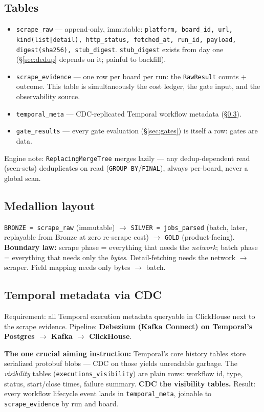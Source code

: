 \documentclass[11pt,a4paper]{article}
\begin{document}
\subsection{Tables}
\begin{itemize}
\item \texttt{scrape\_raw} --- append-only, immutable: \texttt{platform, board\_id, url, kind(list|detail),
http\_status, fetched\_at, run\_id, payload, digest(sha256), stub\_digest}. \texttt{stub\_digest} exists
from day one (\S\ref{sec:dedup} depends on it; painful to backfill).
\item \texttt{scrape\_evidence} --- one row per board per run: the \texttt{RawResult} counts + outcome.
This table is simultaneously the cost ledger, the gate input, and the observability source.
\item \texttt{temporal\_meta} --- CDC-replicated Temporal workflow metadata (\S\ref{sec:cdc}).
\item \texttt{gate\_results} --- every gate evaluation (\S\ref{sec:gates}) is itself a row: gates are data.
\end{itemize}

Engine note: \texttt{ReplacingMergeTree} merges lazily --- any dedup-dependent read (seen-sets) deduplicates
on read (\texttt{GROUP BY}/\texttt{FINAL}), always per-board, never a global scan.

\subsection{Medallion layout}
\texttt{BRONZE = scrape\_raw} (immutable) $\rightarrow$ \texttt{SILVER = jobs\_parsed} (batch, later,
replayable from Bronze at zero re-scrape cost) $\rightarrow$ \texttt{GOLD} (product-facing).
\textbf{Boundary law:} scrape phase = everything that needs the \emph{network}; batch phase = everything
that needs only the \emph{bytes}. Detail-fetching needs the network $\rightarrow$ scraper. Field mapping
needs only bytes $\rightarrow$ batch.

\subsection{Temporal metadata via CDC}
\label{sec:cdc}
Requirement: all Temporal execution metadata queryable in ClickHouse next to the scrape evidence.
Pipeline: \textbf{Debezium (Kafka Connect) on Temporal's Postgres $\rightarrow$ Kafka $\rightarrow$
ClickHouse}.

\textbf{The one crucial aiming instruction:} Temporal's core history tables store serialized protobuf blobs
--- CDC on those yields unreadable garbage. The \emph{visibility} tables
(\texttt{executions\_visibility}) are plain rows: workflow id, type, status, start/close times, failure
summary. \textbf{CDC the visibility tables.} Result: every workflow lifecycle event lands in
\texttt{temporal\_meta}, joinable to \texttt{scrape\_evidence} by run and board.
\end{document}
